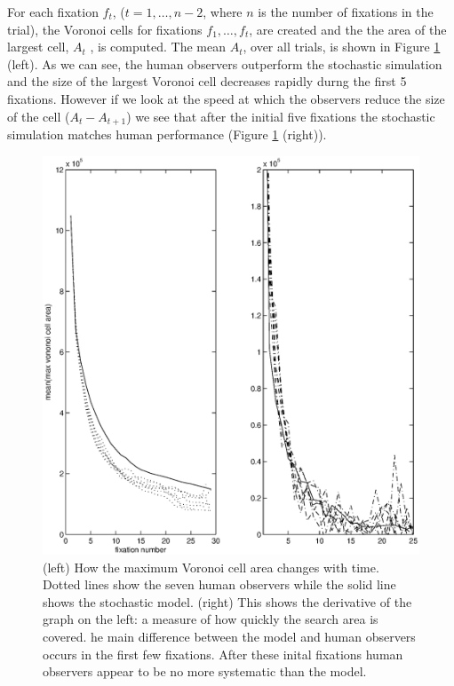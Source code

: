For each fixation $f_t$, ($t=1,\ldots,n-2$, where $n$ is the number of fixations in the trial), the Voronoi cells for fixations $f_1,\ldots,f_t$, are created and the the area of the largest cell, $A_t$ , is computed. The mean $A_t$, over all trials, is shown in Figure \ref{fig:VoronoiTime} (left). As we can see, the human observers outperform the stochastic simulation and the size of the largest Voronoi cell decreases rapidly durng the first 5 fixations. However if we look at the speed at which the observers reduce the size of the cell ($A_t-A_{t+1}$) we see that after the initial five fixations the stochastic simulation matches human performance (Figure \ref{fig:VoronoiTime} (right)).

\par

\begin{figure}
	\centering
		\includegraphics[width=14cm]{figures/VoronoiTime.eps}
	\caption{(left) How the maximum Voronoi cell area changes with time. Dotted lines show the seven human observers while the solid line shows the stochastic model. (right) This shows the derivative of the graph on the left: a measure of how quickly the search area is covered.	he main difference between the model and human observers occurs in the first few fixations. After these inital fixations human observers appear to be no more systematic than the model.}
	\label{fig:VoronoiTime}
\end{figure}
